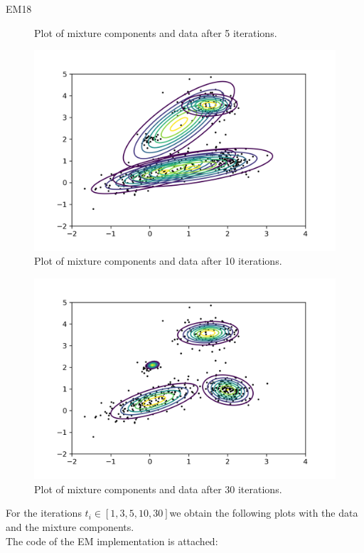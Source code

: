 \begin{questions}
\begin{question}{EM}{18}
\begin{figure}[]
	\centering
	\caption{Plot of mixture components and data after 5 iterations.}
	\label{fig:5}
\end{figure}
\begin{figure}[]
	\includegraphics[width=0.8\linewidth]{pictures/em_iter_10.png}
	\centering
	\caption{Plot of mixture components and data after 10 iterations.}
	\label{fig:10}
\end{figure}
\begin{figure}[]
	\includegraphics[width=0.8\linewidth]{pictures/em_iter_30.png}
	\centering
	\caption{Plot of mixture components and data after 30 iterations.}
	\label{fig:30}
\end{figure}
\begin{answer}
For the iterations $t_i \in [1,3,5,10,30]$we obtain the following plots with the data and the mixture components.\\
The code of the EM implementation is attached:

\end{answer}

\end{question}

\end{questions}
